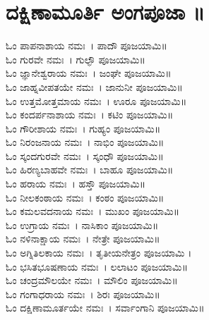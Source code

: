 \section{ದಕ್ಷಿಣಾಮೂರ್ತಿ ಅಂಗಪೂಜಾ ॥}
ಓಂ ಪಾಪನಾಶಾಯ ನಮಃ~। ಪಾದೌ ಪೂಜಯಾಮಿ॥\\
ಓಂ ಗುರವೇ ನಮಃ~। ಗುಲ್ಫೌ ಪೂಜಯಾಮಿ॥\\
ಓಂ ಜ್ಞಾನೇಶ್ವರಾಯ ನಮಃ~। ಜಂಘೇ ಪೂಜಯಾಮಿ॥\\
ಓಂ ಜಾಹ್ನವೀಪತಯೇ ನಮಃ~। ಜಾನುನೀ ಪೂಜಯಾಮಿ॥\\
ಓಂ ಉತ್ತಮೋತ್ತಮಾಯ ನಮಃ~। ಊರೂ ಪೂಜಯಾಮಿ॥\\
ಓಂ ಕಂದರ್ಪನಾಶಾಯ ನಮಃ~। ಕಟಿಂ ಪೂಜಯಾಮಿ॥\\
ಓಂ ಗೌರೀಶಾಯ ನಮಃ~। ಗುಹ್ಯಂ ಪೂಜಯಾಮಿ॥\\
ಓಂ ನಿರಂಜನಾಯ ನಮಃ~। ನಾಭಿಂ ಪೂಜಯಾಮಿ॥\\
ಓಂ ಸ್ಕಂದಗುರವೇ ನಮಃ~। ಸ್ಕಂಧೌ ಪೂಜಯಾಮಿ॥\\
ಓಂ ಹಿರಣ್ಯಬಾಹವೇ ನಮಃ~। ಬಾಹೂ ಪೂಜಯಾಮಿ॥\\
ಓಂ ಹರಾಯ ನಮಃ~। ಹಸ್ತೌ ಪೂಜಯಾಮಿ॥\\
ಓಂ ನೀಲಕಂಠಾಯ ನಮಃ~। ಕಂಠಂ ಪೂಜಯಾಮಿ॥\\
ಓಂ ಕಮಲವದನಾಯ ನಮಃ~। ಮುಖಂ ಪೂಜಯಾಮಿ॥\\
ಓಂ ಉಗ್ರಾಯ ನಮಃ~। ನಾಸಿಕಾಂ ಪೂಜಯಾಮಿ॥\\
ಓಂ ನಳಿನಾಕ್ಷಾಯ ನಮಃ~। ನೇತ್ರೇ ಪೂಜಯಾಮಿ॥\\
ಓಂ ಅಗ್ನಿತಿಲಕಾಯ ನಮಃ~। ತೃತೀಯನೇತ್ರಂ ಪೂಜಯಾಮಿ ।\\
ಓಂ ಭಸಿತಭೂಷಣಾಯ ನಮಃ~। ಲಲಾಟಂ ಪೂಜಯಾಮಿ॥\\
ಓಂ ಚಂದ್ರಮೌಲಯೇ ನಮಃ~। ಮೌಲಿಂ ಪೂಜಯಾಮಿ॥\\
ಓಂ ಗಂಗಾಧರಾಯ ನಮಃ~। ಶಿರಃ ಪೂಜಯಾಮಿ॥\\
ಓಂ ದಕ್ಷಿಣಾಮೂರ್ತಯೇ ನಮಃ~। ಸರ್ವಾಂಗಾನಿ ಪೂಜಯಾಮಿ॥
